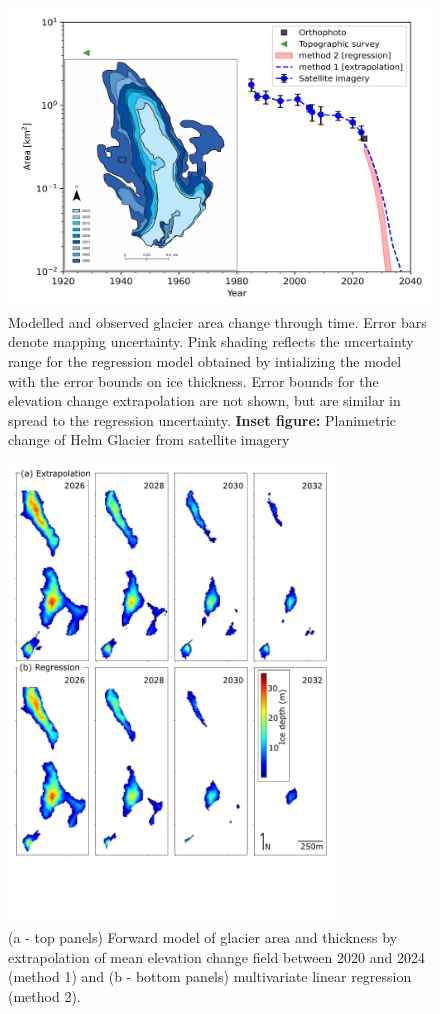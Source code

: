 \documentclass[annals,review,oneside]{igs}
\begin{document}
\begin{figure}[H]
\centering
\includegraphics[width=150mm,trim=0.5cm 0.5cm 0.5cm 0.5cm, clip=true]
{area_change_combined.jpg}
\caption{Modelled and observed glacier area change through time. Error bars denote mapping uncertainty. Pink shading reflects the uncertainty range for the regression model obtained by intializing the model with the error bounds on ice thickness. Error bounds for the elevation change extrapolation are not shown, but are similar in spread to the regression uncertainty. \textbf{Inset figure:} Planimetric change of Helm Glacier from satellite imagery}
\label{area}
\end{figure}

\begin{figure}[H]
\centering
\includegraphics[width=86mm,trim=0cm 4.3cm 0cm 0cm, clip=true]
{forward.pdf}
\caption{(a - top panels) Forward model of glacier area and thickness by extrapolation of mean elevation change field between 2020 and 2024 (method 1) and (b - bottom panels) multivariate linear regression (method 2).}
\label{loss_map}
\end{figure}
\end{document}
